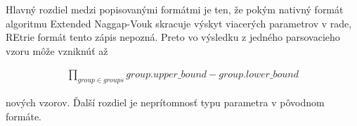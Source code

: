 Hlavný rozdiel medzi popisovanými formátmi je ten, že pokým nativný formát algoritmu Extended Naggap-Vouk skracuje výskyt viacerých parametrov v rade, REtrie formát tento zápis nepozná. Preto vo výsledku z jedného parsovacieho vzoru môže vzniknúť až

\begin{align*}
\prod_{group \in groups} group.upper\_bound - group.lower\_bound
\end{align*}

nových vzorov. Ďalší rozdiel je neprítomnosť typu parametra v pôvodnom formáte.
